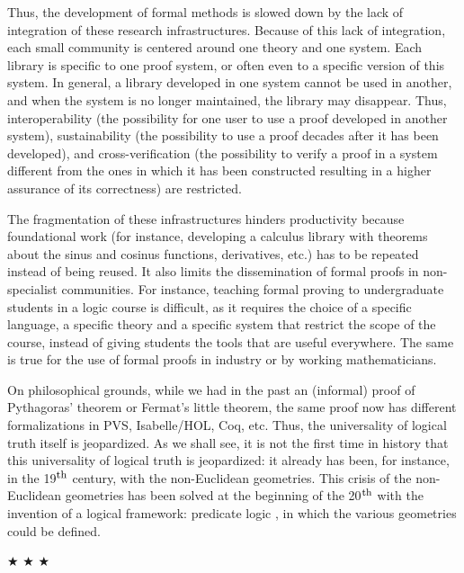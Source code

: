 Thus, the development of formal methods is slowed down by the lack of
integration of these research infrastructures.  Because of this lack
of integration, each small community is centered around one theory and
one system. Each library is specific to one proof system, or often
even to a specific version of this system. In general, a library
developed in one system cannot be used in another, and when the system
is no longer maintained, the library may disappear.  Thus,
interoperability (the possibility for one user to use a proof
developed in another system), sustainability (the possibility to use a
proof decades after it has been developed), and cross-verification
(the possibility to verify a proof in a system different from the ones in
which it has been constructed resulting in a higher assurance of its
correctness) are restricted.

The fragmentation of these infrastructures hinders productivity
because foundational work (for instance, developing a calculus library
with theorems about the sinus and cosinus functions, derivatives,
etc.) has to be repeated instead of being reused.  It also limits the
dissemination of formal proofs in non-specialist communities. For
instance, teaching formal proving to undergraduate students in a logic
course is difficult, as it requires the choice of a specific language,
a specific theory and a specific system that restrict the scope of the
course, instead of giving students the tools that are useful
everywhere. The same is true for the use of formal proofs in industry
or by working mathematicians.

On philosophical grounds, while we had in the past an (informal) proof
of Pythagoras' theorem or Fermat's little theorem, the same proof now
has different formalizations in PVS, Isabelle/HOL, Coq, etc.  Thus,
the universality of logical truth itself is jeopardized.  As we shall
see, it is not the first time in history that this universality of
logical truth is jeopardized: it already has been, for instance, in
the 19$^{\mbox{\footnotesize th}}$ century, with the non-Euclidean
geometries. This crisis of the non-Euclidean geometries has been
solved at the beginning of the 20$^{\mbox{\footnotesize th}}$ with the
invention of a logical framework: predicate logic
\cite{HilbertAckermann}, in which the various geometries could be
defined.

\begin{center}
$\bigstar$ $\bigstar$ $\bigstar$
\end{center}


